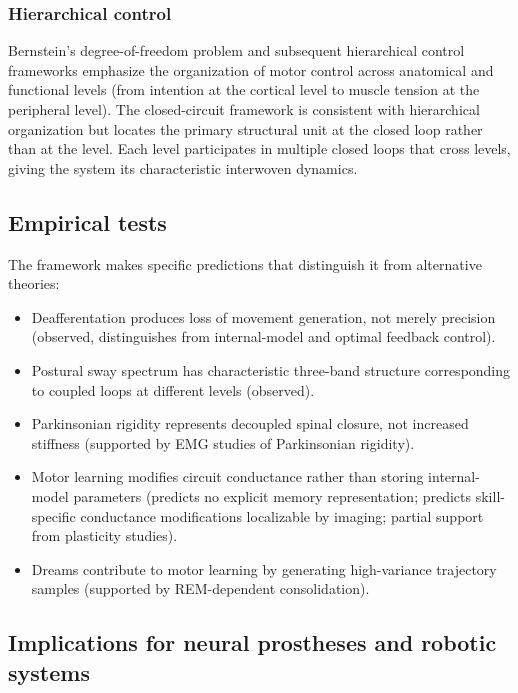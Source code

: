 \documentclass[11pt,twocolumn,a4paper]{article}
\theoremstyle{definition}
\theoremstyle{remark}
\begin{document}
\subsubsection{Hierarchical control}

Bernstein's degree-of-freedom problem \citep{bernstein1967} and
subsequent hierarchical control frameworks \citep{latash2010}
emphasize the organization of motor control across anatomical and
functional levels (from intention at the cortical level to muscle
tension at the peripheral level). The closed-circuit framework is
consistent with hierarchical organization but locates the primary
structural unit at the closed loop rather than at the level. Each
level participates in multiple closed loops that cross levels, giving
the system its characteristic interwoven dynamics.

\subsection{Empirical tests}

The framework makes specific predictions that distinguish it from
alternative theories:
\begin{itemize}[leftmargin=*,itemsep=1pt]
\item Deafferentation produces loss of movement generation, not
merely precision (observed, distinguishes from internal-model and
optimal feedback control).
\item Postural sway spectrum has characteristic three-band structure
corresponding to coupled loops at different levels (observed).
\item Parkinsonian rigidity represents decoupled spinal closure, not
increased stiffness (supported by EMG studies of Parkinsonian
rigidity).
\item Motor learning modifies circuit conductance rather than
storing internal-model parameters (predicts no explicit memory
representation; predicts skill-specific conductance modifications
localizable by imaging; partial support from plasticity studies).
\item Dreams contribute to motor learning by generating high-variance
trajectory samples (supported by REM-dependent consolidation).
\end{itemize}

\subsection{Implications for neural prostheses and robotic systems}
\end{document}

